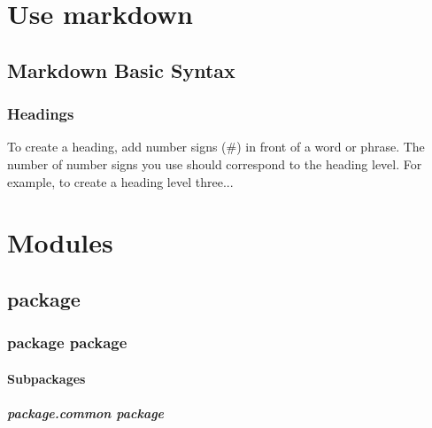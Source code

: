 \documentclass[letterpaper,10pt,dvipdfmx]{sphinxmanual}
\begin{document}
\chapter{Use markdown}
\label{\detokenize{index:use-markdown}}
\sphinxstepscope


\section{Markdown Basic Syntax}
\label{\detokenize{Note:markdown-basic-syntax}}\label{\detokenize{Note::doc}}

\subsection{Headings}
\label{\detokenize{Note:headings}}
\sphinxAtStartPar
To create a heading, add number signs (\#) in front of a word or phrase. The number of number signs you use should correspond to the heading level. For example, to create a heading level three...

\begin{DUlineblock}{0em}
\item[] 
\end{DUlineblock}


\chapter{Modules}
\label{\detokenize{index:modules}}
\sphinxstepscope


\section{package}
\label{\detokenize{modules:package}}\label{\detokenize{modules::doc}}
\sphinxstepscope


\subsection{package package}
\label{\detokenize{package:package-package}}\label{\detokenize{package::doc}}

\subsubsection{Subpackages}
\label{\detokenize{package:subpackages}}
\sphinxstepscope


\paragraph{package.common package}
\label{\detokenize{package.common:package-common-package}}\label{\detokenize{package.common::doc}}
\end{document}
